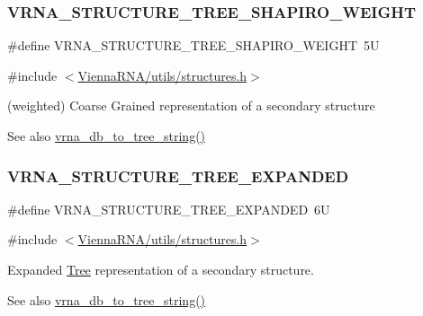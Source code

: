 \subsubsection{\texorpdfstring{VRNA\_STRUCTURE\_TREE\_SHAPIRO\_WEIGHT}{VRNA\_STRUCTURE\_TREE\_SHAPIRO\_WEIGHT}}
{\footnotesize\ttfamily \#define V\+R\+N\+A\+\_\+\+S\+T\+R\+U\+C\+T\+U\+R\+E\+\_\+\+T\+R\+E\+E\+\_\+\+S\+H\+A\+P\+I\+R\+O\+\_\+\+W\+E\+I\+G\+HT~5U}



{\ttfamily \#include $<$\mbox{\hyperlink{utils_2structures_8h}{Vienna\+R\+N\+A/utils/structures.\+h}}$>$}



(weighted) Coarse Grained representation of a secondary structure 

\begin{DoxySeeAlso}{See also}
\mbox{\hyperlink{group__struct__utils__tree_ga56551ab7da64933a7230d29430f40cfe}{vrna\+\_\+db\+\_\+to\+\_\+tree\+\_\+string()}} 
\end{DoxySeeAlso}
\mbox{\label{group__struct__utils__tree_gab3b65489d1322da65d3a3e53242307ef}} 
\subsubsection{\texorpdfstring{VRNA\_STRUCTURE\_TREE\_EXPANDED}{VRNA\_STRUCTURE\_TREE\_EXPANDED}}
{\footnotesize\ttfamily \#define V\+R\+N\+A\+\_\+\+S\+T\+R\+U\+C\+T\+U\+R\+E\+\_\+\+T\+R\+E\+E\+\_\+\+E\+X\+P\+A\+N\+D\+ED~6U}



{\ttfamily \#include $<$\mbox{\hyperlink{utils_2structures_8h}{Vienna\+R\+N\+A/utils/structures.\+h}}$>$}



Expanded \mbox{\hyperlink{structTree}{Tree}} representation of a secondary structure. 

\begin{DoxySeeAlso}{See also}
\mbox{\hyperlink{group__struct__utils__tree_ga56551ab7da64933a7230d29430f40cfe}{vrna\+\_\+db\+\_\+to\+\_\+tree\+\_\+string()}} 
\end{DoxySeeAlso}


